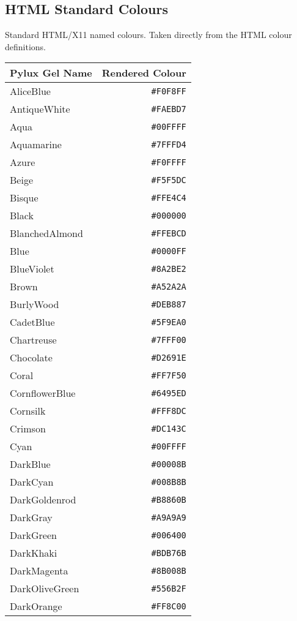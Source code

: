 \documentclass[a4paper]{article}
\begin{document}
\subsection{HTML Standard Colours}
Standard HTML/X11 named colours. Taken directly from the HTML colour 
definitions.
\begin{longtable}{|l|r|}
\hline
Pylux Gel Name & Rendered Colour \\ \hline
AliceBlue & \texttt{\#F0F8FF} \\
AntiqueWhite & \texttt{\#FAEBD7} \\
Aqua & \texttt{\#00FFFF} \\
Aquamarine & \texttt{\#7FFFD4} \\
Azure & \texttt{\#F0FFFF} \\
Beige & \texttt{\#F5F5DC} \\
Bisque & \texttt{\#FFE4C4} \\
Black & \texttt{\#000000} \\
BlanchedAlmond & \texttt{\#FFEBCD} \\
Blue & \texttt{\#0000FF} \\
BlueViolet & \texttt{\#8A2BE2} \\
Brown & \texttt{\#A52A2A} \\
BurlyWood & \texttt{\#DEB887} \\
CadetBlue & \texttt{\#5F9EA0} \\
Chartreuse & \texttt{\#7FFF00} \\
Chocolate & \texttt{\#D2691E} \\
Coral & \texttt{\#FF7F50} \\
CornflowerBlue & \texttt{\#6495ED} \\
Cornsilk & \texttt{\#FFF8DC} \\
Crimson & \texttt{\#DC143C} \\
Cyan & \texttt{\#00FFFF} \\
DarkBlue & \texttt{\#00008B} \\
DarkCyan & \texttt{\#008B8B} \\
DarkGoldenrod & \texttt{\#B8860B} \\
DarkGray & \texttt{\#A9A9A9} \\
DarkGreen & \texttt{\#006400} \\
DarkKhaki & \texttt{\#BDB76B} \\
DarkMagenta & \texttt{\#8B008B} \\
DarkOliveGreen & \texttt{\#556B2F} \\
DarkOrange & \texttt{\#FF8C00} \\

\end{longtable}
\end{document}
